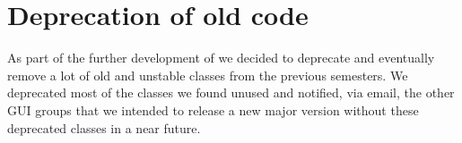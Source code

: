 
\section{Deprecation of old code}
\label{sec:deprecation_of_old_code}

As part of the further development of \gc we decided to deprecate and eventually remove a lot of old and unstable classes from the previous semesters. We deprecated most of the classes we found unused and notified, via email, the other GUI groups that we intended to release a new major version without these deprecated classes in a near future.  